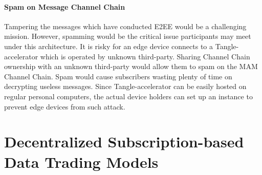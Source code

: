 \begin{spacing}{2.0}
\subsubsection{Spam on Message Channel Chain}
Tampering the messages which have conducted E2EE would be a challenging mission. However, spamming would be the critical issue participants may meet under this architecture. It is risky for an edge device connects to a Tangle-accelerator which is operated by unknown third-party. Sharing Channel Chain ownership with an unknown third-party would allow them to spam on the MAM Channel Chain. Spam would cause subscribers wasting plenty of time on decrypting useless messages. Since Tangle-accelerator can be easily hosted on regular personal computers, the actual device holders can set up an instance to prevent edge devices from such attack.

\end{spacing}
\clearpage
{}

\newpage
{}
\chapter{Decentralized Subscription-based Data Trading Models}
\pagestyle{plain}

